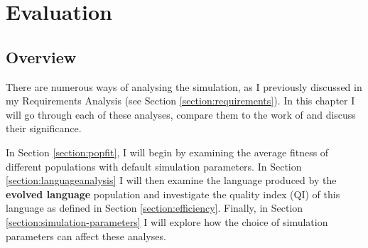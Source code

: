\documentclass[12pt,a4paper,twoside,openright]{report}
\begin{document}

\chapter{Evaluation}





\section{Overview}


There are numerous ways of analysing the simulation, as I previously discussed in my Requirements Analysis (see Section \ref{section:requirements}). In this chapter I will go through each of these analyses, compare them to the work of \citet{Cangelosi1998} and discuss their significance.

In Section \ref{section:popfit}, I will begin by examining the average fitness of different populations with default simulation parameters. In Section \ref{section:languageanalysis} I will then examine the language produced by the {\bf evolved language} population and investigate the quality index (QI) of this language as defined in Section \ref{section:efficiency}. Finally, in Section \ref{section:simulation-parameters} I will explore how the choice of simulation parameters can affect these analyses. 
\end{document}
